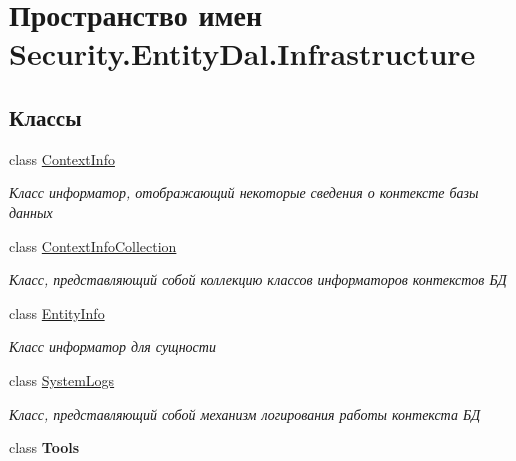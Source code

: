 \hypertarget{namespace_security_1_1_entity_dal_1_1_infrastructure}{}\section{Пространство имен Security.\+Entity\+Dal.\+Infrastructure}
\label{namespace_security_1_1_entity_dal_1_1_infrastructure}
\subsection*{Классы}
\begin{DoxyCompactItemize}
\item 
class \hyperlink{class_security_1_1_entity_dal_1_1_infrastructure_1_1_context_info}{Context\+Info}
\begin{DoxyCompactList}\small\item\em Класс информатор, отображающий некоторые сведения о контексте базы данных \end{DoxyCompactList}\item 
class \hyperlink{class_security_1_1_entity_dal_1_1_infrastructure_1_1_context_info_collection}{Context\+Info\+Collection}
\begin{DoxyCompactList}\small\item\em Класс, представляющий собой коллекцию классов информаторов контекстов БД \end{DoxyCompactList}\item 
class \hyperlink{class_security_1_1_entity_dal_1_1_infrastructure_1_1_entity_info}{Entity\+Info}
\begin{DoxyCompactList}\small\item\em Класс информатор для сущности \end{DoxyCompactList}\item 
class \hyperlink{class_security_1_1_entity_dal_1_1_infrastructure_1_1_system_logs}{System\+Logs}
\begin{DoxyCompactList}\small\item\em Класс, представляющий собой механизм логирования работы контекста БД \end{DoxyCompactList}\item 
class {\bfseries Tools}
\end{DoxyCompactItemize}
